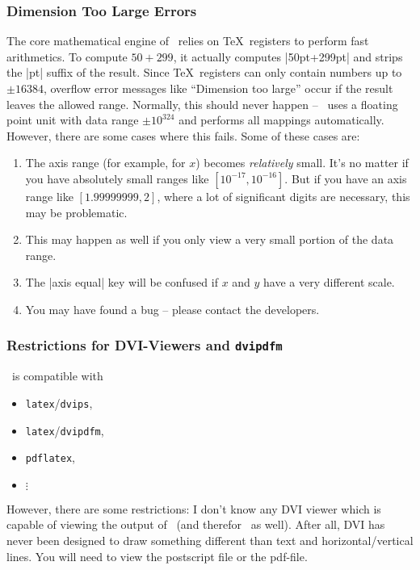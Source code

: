 \subsubsection{Dimension Too Large Errors}
The core mathematical engine of \PGF\ relies on \TeX\ registers to perform fast arithmetics. To compute $50+299$, it actually computes |50pt+299pt| and strips the |pt| suffix of the result. Since \TeX\ registers can only contain numbers up to $\pm 16384$, overflow error messages like ``Dimension too large'' occur if the result leaves the allowed range. Normally, this should never happen -- \PGFPlots\ uses a floating point unit with data range $\pm 10^{324}$ and performs all mappings automatically. However, there are some cases where this fails. Some of these cases are:
\begin{enumerate}
	\item The axis range (for example, for $x$) becomes \emph{relatively} small. It's no matter if you have absolutely small ranges like $[10^{-17},10^{-16}]$. But if you have an axis range like $[1.99999999,2]$, where a lot of significant digits are necessary, this may be problematic.
	\item This may happen as well if you only view a very small portion of the data range.
	\item The |axis equal| key will be confused if $x$ and $y$ have a very different scale.
	\item You may have found a bug -- please contact the developers.
\end{enumerate}

\subsubsection{Restrictions for DVI-Viewers and \texttt{dvipdfm}}
\label{sec:drivers}%
\PGF\ is compatible with 
\begin{itemize}
	\item \lstinline!latex!/\lstinline!dvips!,
	\item \lstinline!latex!/\lstinline!dvipdfm!,
	\item \lstinline!pdflatex!,
	\item $\vdots$
\end{itemize}
However, there are some restrictions: I don't know any DVI viewer which is capable of viewing the output of \PGF\ (and therefor \PGFPlots\ as well). After all, DVI has never been designed to draw something different than text and horizontal/vertical lines. You will need to view the postscript file or the pdf-file. 

